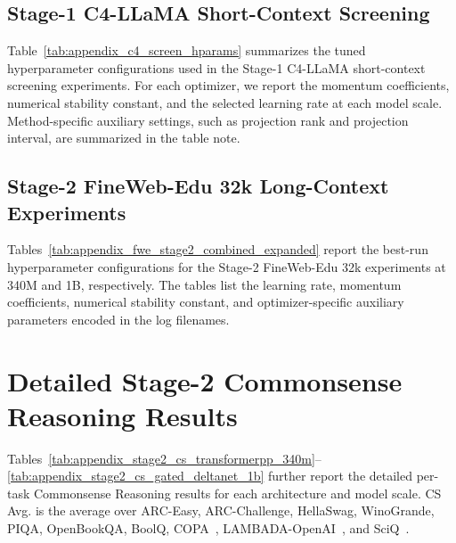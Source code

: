 \documentclass{opendatalab}
\begin{document}
\subsection{Stage-1 C4-LLaMA Short-Context Screening}
\label{app:stage1-hparams}

Table~\ref{tab:appendix_c4_screen_hparams} summarizes the tuned hyperparameter
configurations used in the Stage-1 C4-LLaMA short-context screening
experiments. For each optimizer, we report the momentum coefficients,
numerical stability constant, and the selected learning rate at each model
scale. Method-specific auxiliary settings, such as projection rank and
projection interval, are summarized in the table note.



\subsection{Stage-2 FineWeb-Edu 32k Long-Context Experiments}
\label{app:stage2-fwe-hparams}

Tables~\ref{tab:appendix_fwe_stage2_combined_expanded} report the best-run hyperparameter
configurations for the Stage-2 FineWeb-Edu 32k experiments at 340M and 1B,
respectively. The tables list the learning rate, momentum coefficients,
numerical stability constant, and optimizer-specific auxiliary parameters
encoded in the log filenames.




\section{Detailed Stage-2 Commonsense Reasoning Results}
\label{app:stage2-cs-details}
Tables~\ref{tab:appendix_stage2_cs_transformerpp_340m}--\ref{tab:appendix_stage2_cs_gated_deltanet_1b}
further report the detailed per-task Commonsense Reasoning results for each
architecture and model scale. CS Avg. is the average over ARC-Easy,
ARC-Challenge, HellaSwag, WinoGrande, PIQA, OpenBookQA, BoolQ,
COPA~\cite{roemmele2011choice}, LAMBADA-OpenAI~\cite{paperno-EtAl:2016:P16-1}, and SciQ~\cite{welbl2017crowdsourcing}.




\end{document}
